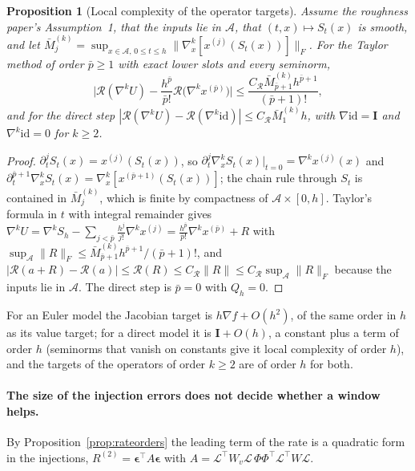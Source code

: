 \documentclass[11pt]{article}
\newtheorem{proposition}{Proposition}
\theoremstyle{definition}
\theoremstyle{remark}
\newcommand{\I}{\mathbf{I}}
\newcommand{\eps}{\bm{\epsilon}}
\newcommand{\Rgh}{\mathcal{R}}
\newcommand{\LL}{\mathcal{L}}
\begin{document}
\begin{proposition}[Local complexity of the operator targets]\label{prop:opcomplexity}
Assume the roughness paper's Assumption~1, that the inputs lie in $\mathcal A$, that $(t,x)\mapsto S_t(x)$ is smooth, and let $\bar M^{(k)}_{j}=\sup_{x\in\mathcal A,\,0\le t\le h}\|\nabla_x^k[x^{(j)}(S_t(x))]\|_F$.
For the Taylor method of order $\bar p\ge1$ with exact lower slots and every seminorm,
\[
\Big|\Rgh(\nabla^kU)-\frac{h^{\bar p}}{\bar p!}\Rgh\big(\nabla^kx^{(\bar p)}\big)\Big|\le\frac{C_\Rgh\bar M^{(k)}_{\bar p+1}h^{\bar p+1}}{(\bar p+1)!},
\]
and for the direct step $|\Rgh(\nabla^kU)-\Rgh(\nabla^k\mathrm{id})|\le C_\Rgh\bar M^{(k)}_1h$, with $\nabla\mathrm{id}=\I$ and $\nabla^k\mathrm{id}=0$ for $k\ge2$.
\end{proposition}

\begin{proof}
$\partial_t^jS_t(x)=x^{(j)}(S_t(x))$, so $\partial_t^j\nabla_x^kS_t(x)|_{t=0}=\nabla^kx^{(j)}(x)$ and $\partial_t^{\bar p+1}\nabla_x^kS_t(x)=\nabla_x^k[x^{(\bar p+1)}(S_t(x))]$; the chain rule through $S_t$ is contained in $\bar M^{(k)}_j$, which is finite by compactness of $\mathcal A\times[0,h]$.
Taylor's formula in $t$ with integral remainder gives $\nabla^kU=\nabla^kS_h-\sum_{j<\bar p}\frac{h^j}{j!}\nabla^kx^{(j)}=\frac{h^{\bar p}}{\bar p!}\nabla^kx^{(\bar p)}+R$ with $\sup_{\mathcal A}\|R\|_F\le\bar M^{(k)}_{\bar p+1}h^{\bar p+1}/(\bar p+1)!$, and $|\Rgh(a+R)-\Rgh(a)|\le\Rgh(R)\le C_\Rgh\|R\|\le C_\Rgh\sup_{\mathcal A}\|R\|_F$ because the inputs lie in $\mathcal A$. The direct step is $\bar p=0$ with $Q_h=0$.
\end{proof}

For an Euler model the Jacobian target is $h\nabla f+O(h^2)$, of the same order in $h$ as its value target; for a direct model it is $\I+O(h)$, a constant plus a term of order $h$ (seminorms that vanish on constants give it local complexity of order $h$), and the targets of the operators of order $k\ge2$ are of order $h$ for both.

\paragraph{The size of the injection errors does not decide whether a window helps.}
By Proposition~\ref{prop:rateorders} the leading term of the rate is a quadratic form in the injections, $R^{(2)}=\eps^\top A\eps$ with $A=\LL^\top W_v\LL\,\Phi\Phi^\top\LL^\top W\LL$.
\end{document}
